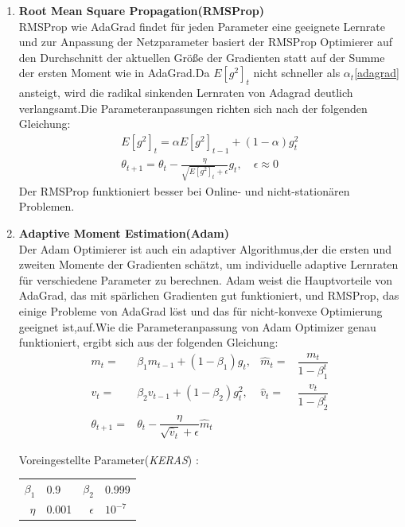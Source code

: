 \documentclass[12pt,a4paper]{scrartcl}
\numberwithin{equation}{section}
\begin{document}
\begin{enumerate}
\item \textbf{Root Mean Square Propagation(RMSProp)}\\
RMSProp wie AdaGrad findet für jeden Parameter eine geeignete Lernrate und zur Anpassung der Netzparameter basiert der RMSProp Optimierer auf den Durchschnitt der aktuellen Größe der Gradienten statt auf der Summe der ersten Moment wie in AdaGrad.Da $ E[g^2]_t $ nicht schneller als $ \alpha_{t} $\eqref{adagrad} ansteigt, wird die radikal sinkenden Lernraten von Adagrad deutlich verlangsamt.Die Parameteranpassungen richten sich nach der folgenden Gleichung:
\begin{equation}\label{RMSProp}
\begin{split}
E[g^2]_t =\alpha E[g^2]_{t-1} +(1-\alpha)g^2_{t}\\
\theta_{t+1} = \theta_{t} -\frac{\eta}{\sqrt{E[g^2]_t}+\epsilon} g_t, \quad  \epsilon \approx 0
\end{split}
\end{equation}
Der RMSProp funktioniert besser bei Online- und nicht-stationären Problemen.

\item \textbf{Adaptive Moment Estimation(Adam)}\\
Der Adam\cite{adam} Optimierer ist auch ein adaptiver Algorithmus,der die ersten und zweiten Momente der Gradienten schätzt, um individuelle adaptive Lernraten für verschiedene Parameter zu berechnen.
Adam weist die Hauptvorteile von AdaGrad, das mit spärlichen Gradienten gut funktioniert, und RMSProp, das einige Probleme von AdaGrad löst und das für nicht-konvexe Optimierung geeignet ist,auf.Wie die Parameteranpassung von Adam Optimizer genau funktioniert, ergibt sich aus der folgenden Gleichung: 
\begin{equation}\label{ADAM}
\begin{aligned}
m_{t}=& \beta_{1}m_{t-1}+(1-\beta_{1})g_{t}, &  \widehat{m}_{t} =& \dfrac{m_{t}}{1-\beta_{1}^t}\\
v_{t}=& \beta_{2}v_{t-1}+(1-\beta_{2})g^2_t,&\widehat{v}_{t} =&\dfrac{v_t}{1-\beta_{2}^t}\\
\theta_{t+1} =& \theta_{t} -\dfrac{\eta}{\sqrt{\widehat{v}_{t}}+\epsilon}\widehat{m}_{t}
\end{aligned}
\end{equation}
\begin{center}
	Voreingestellte Parameter(\textit{KERAS}) :
	\begin{tabular}{r@{: }l r@{: }l}
		$ \beta_{1}$ & 0.9 &$ \beta_{2} $& 0.999\\
		$ \eta$& 0.001& $ \epsilon $ & $ 10^{-7} $
	\end{tabular}
\end{center}


\end{enumerate}
\end{document}
